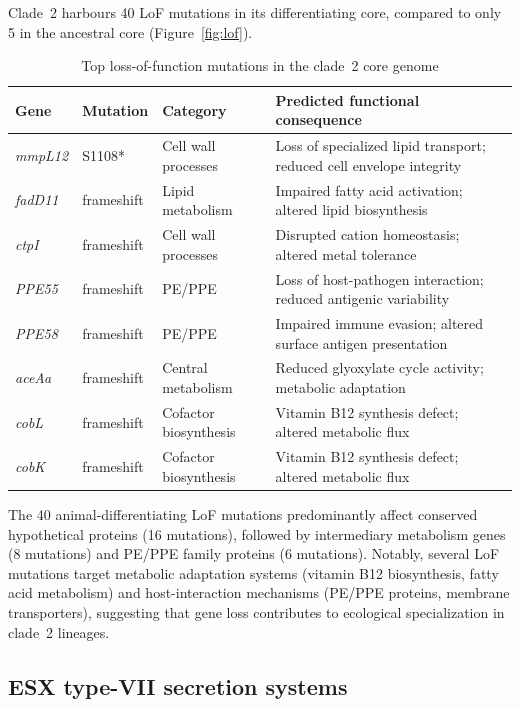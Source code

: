 \documentclass[11pt,a4paper]{article}
\begin{document}
Clade~2 harbours 40 LoF mutations in its differentiating core,
compared to only 5 in the ancestral core (Figure~\ref{fig:lof}).
%
\begin{table}[h]
\centering
\caption{Top loss-of-function mutations in the clade~2 core genome}
\label{tab:lof_genes}
\begin{tabular}{@{}lllp{6cm}@{}}
\toprule
\textbf{Gene} & \textbf{Mutation} & \textbf{Category} & \textbf{Predicted functional consequence} \\
\midrule
\textit{mmpL12} & S1108* & Cell wall processes & Loss of specialized lipid transport; reduced cell envelope integrity \\
\textit{fadD11} & frameshift & Lipid metabolism & Impaired fatty acid activation; altered lipid biosynthesis \\
\textit{ctpI} & frameshift & Cell wall processes & Disrupted cation homeostasis; altered metal tolerance \\
\textit{PPE55} & frameshift & PE/PPE & Loss of host-pathogen interaction; reduced antigenic variability \\
\textit{PPE58} & frameshift & PE/PPE & Impaired immune evasion; altered surface antigen presentation \\
\textit{aceAa} & frameshift & Central metabolism & Reduced glyoxylate cycle activity; metabolic adaptation \\
\textit{cobL} & frameshift & Cofactor biosynthesis & Vitamin B12 synthesis defect; altered metabolic flux \\
\textit{cobK} & frameshift & Cofactor biosynthesis & Vitamin B12 synthesis defect; altered metabolic flux \\
\bottomrule
\end{tabular}
\end{table}

The 40 animal-differentiating LoF mutations predominantly affect conserved hypothetical proteins (16 mutations), followed by intermediary metabolism genes (8 mutations) and PE/PPE family proteins (6 mutations). Notably, several LoF mutations target metabolic adaptation systems (vitamin B12 biosynthesis, fatty acid metabolism) and host-interaction mechanisms (PE/PPE proteins, membrane transporters), suggesting that gene loss contributes to ecological specialization in clade~2 lineages.

\subsection{ESX type-VII secretion systems}
\label{sec:results:esx}
\end{document}
